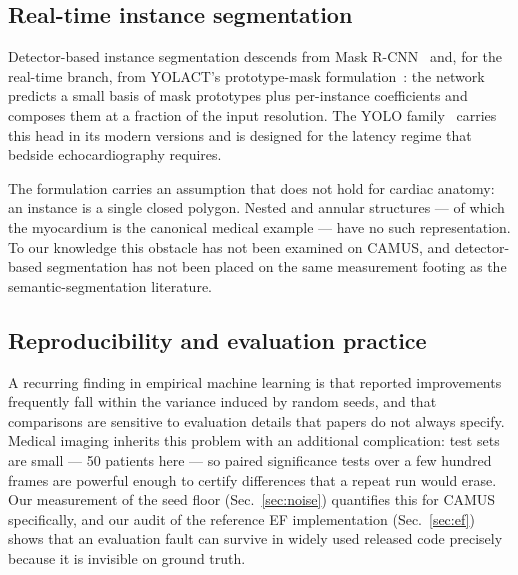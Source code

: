 \subsection{Real-time instance segmentation}

Detector-based instance segmentation descends from Mask
R-CNN~\cite{he2017maskrcnn} and, for the real-time branch, from YOLACT's
prototype-mask formulation~\cite{bolya2019yolact}: the network predicts a small
basis of mask prototypes plus per-instance coefficients and composes them at a
fraction of the input resolution. The YOLO family~\cite{redmon2016yolo} carries
this head in its modern versions and is designed for the latency regime that
bedside echocardiography requires.

The formulation carries an assumption that does not hold for cardiac anatomy:
an instance is a single closed polygon. Nested and annular structures --- of
which the myocardium is the canonical medical example --- have no such
representation. To our knowledge this obstacle has not been examined on CAMUS,
and detector-based segmentation has not been placed on the same measurement
footing as the semantic-segmentation literature.

\subsection{Reproducibility and evaluation practice}

A recurring finding in empirical machine learning is that reported improvements
frequently fall within the variance induced by random seeds, and that
comparisons are sensitive to evaluation details that papers do not always
specify. Medical imaging inherits this problem with an additional complication:
test sets are small --- 50 patients here --- so paired significance tests over
a few hundred frames are powerful enough to certify differences that a repeat
run would erase. Our measurement of the seed floor (Sec.~\ref{sec:noise})
quantifies this for CAMUS specifically, and our audit of the reference EF
implementation (Sec.~\ref{sec:ef}) shows that an evaluation fault can survive in
widely used released code precisely because it is invisible on ground truth.
